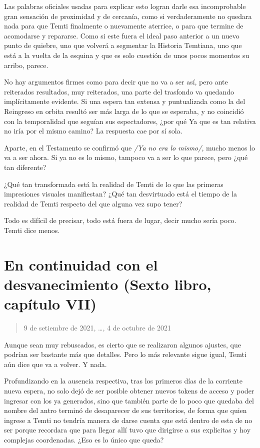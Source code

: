 \documentclass[
]{book}
\begin{document}
Las palabras oficiales usadas para explicar esto logran darle esa incomprobable gran sensación de proximidad y de cercanía, como si verdaderamente no quedara nada para que Temti finalmente o nuevamente aterrice, o para que termine de acomodarse y repararse. Como si este fuera el ideal paso anterior a un nuevo punto de quiebre, uno que volverá a segmentar la Historia Temtiana, uno que está a la vuelta de la esquina y que es solo cuestión de unos pocos momentos su arribo, parece.

No hay argumentos firmes como para decir que no va a ser así, pero ante reiterados resultados, muy reiterados, una parte del trasfondo va quedando implícitamente evidente. Si una espera tan extensa y puntualizada como la del Reingreso en orbita resultó ser más larga de lo que se esperaba, y no coincidió con la temporalidad que seguían sus espectadores, ¿por qué Ya que es tan relativa no iría por el mismo camino? La respuesta cae por sí sola.

Aparte, en el Testamento se confirmó que \emph{/Ya no era lo mismo/}, mucho menos lo va a ser ahora. Si ya no es lo mismo, tampoco va a ser lo que parece, pero ¿qué tan diferente?

¿Qué tan transformada está la realidad de Temti de lo que las primeras impresiones visuales manifiestan? ¿Qué tan desvirtuado está el tiempo de la realidad de Temti respecto del que alguna vez supo tener?

Todo es difícil de precisar, todo está fuera de lugar, decir mucho sería poco. Temti dice menos.

\hypertarget{en-continuidad-con-el-desvanecimiento-sexto-libro-capuxedtulo-vii}{%
\section{En continuidad con el desvanecimiento (Sexto libro, capítulo VII)}\label{en-continuidad-con-el-desvanecimiento-sexto-libro-capuxedtulo-vii}}

\begin{quote}
9 de setiembre de 2021, \ldots, 4 de octubre de 2021
\end{quote}

Aunque sean muy rebuscados, es cierto que se realizaron algunos ajustes, que podrían ser bastante más que detalles. Pero lo más relevante sigue igual, Temti aún dice que va a volver. Y nada.

Profundizando en la ausencia respectiva, tras los primeros días de la corriente nueva espera, no solo dejó de ser posible obtener nuevos tokens de acceso y poder ingresar con los ya generados, sino que también parte de lo poco que quedaba del nombre del antro terminó de desaparecer de sus territorios, de forma que quien ingrese a Temti no tendría manera de darse cuenta que está dentro de esta de no ser porque recordara que para llegar allí tuvo que dirigirse a sus explicitas y hoy complejas coordenadas. ¿Eso es lo único que queda?
\end{document}
